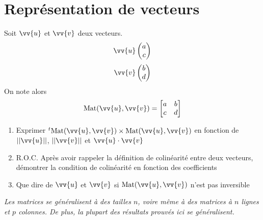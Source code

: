 \section{Représentation de vecteurs}
Soit $\vv{u}$ et $\vv{v}$ deux vecteurs. $$\vv{u} \covec{a}{c}$$$$\vv{v} \covec{b}{d}$$On note alors $$\text{Mat}(\vv{u},\vv{v}) = \begin{bmatrix} a & b \\ c & d\end{bmatrix}$$
\begin{enumerate}
\item Exprimer $^t\text{Mat}(\vv{u},\vv{v})\times \text{Mat}(\vv{u},\vv{v})$ en fonction de $||\vv{u}||$, $||\vv{v}||$ et $\vv{u} \cdot \vv{v}$
\item R.O.C. Après avoir rappeler la définition de colinéarité entre deux vecteurs, démontrer la condition de colinéarité en fonction des coefficients
\item Que dire de $\vv{u}$ et $\vv{v}$ si $\text{Mat}(\vv{u},\vv{v})$ n'est pas inversible
\end{enumerate}
\flushleft
\emph{Les matrices se généralisent à des tailles $n$, voire même à des matrices à $n$ lignes et $p$ colonnes. De plus, la plupart des résultats prouvés ici se généralisent.}
